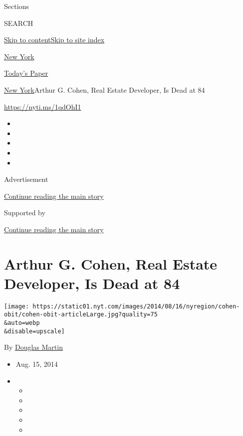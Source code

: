 Sections

SEARCH

\protect\hyperlink{site-content}{Skip to
content}\protect\hyperlink{site-index}{Skip to site index}

\href{https://www.nytimes.com/section/nyregion}{New York}

\href{https://myaccount.nytimes.com/auth/login?response_type=cookie\&client_id=vi}{}

\href{https://www.nytimes.com/section/todayspaper}{Today's Paper}

\href{/section/nyregion}{New York}\textbar{}Arthur G. Cohen, Real Estate
Developer, Is Dead at 84

\url{https://nyti.ms/1qdOhI1}

\begin{itemize}
\item
\item
\item
\item
\item
\end{itemize}

Advertisement

\protect\hyperlink{after-top}{Continue reading the main story}

Supported by

\protect\hyperlink{after-sponsor}{Continue reading the main story}

\hypertarget{arthur-g-cohen-real-estate-developer-is-dead-at-84}{%
\section{Arthur G. Cohen, Real Estate Developer, Is Dead at
84}\label{arthur-g-cohen-real-estate-developer-is-dead-at-84}}

\texttt{[image: https://static01.nyt.com/images/2014/08/16/nyregion/cohen-obit/cohen-obit-articleLarge.jpg?quality=75\\\&auto=webp\\\&disable=upscale]}

By \href{http://www.nytimes.com/by/douglas-martin}{Douglas Martin}

\begin{itemize}
\item
  Aug. 15, 2014
\item
  \begin{itemize}
  \item
  \item
  \item
  \item
  \item
  \end{itemize}
\end{itemize}

